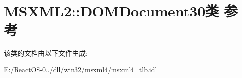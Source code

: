 \hypertarget{class_m_s_x_m_l2_1_1_d_o_m_document30}{}\section{M\+S\+X\+M\+L2\+:\+:D\+O\+M\+Document30类 参考}
\label{class_m_s_x_m_l2_1_1_d_o_m_document30}


该类的文档由以下文件生成\+:\begin{DoxyCompactItemize}
\item 
E\+:/\+React\+O\+S-\/0../dll/win32/msxml4/msxml4\+\_\+tlb.\+idl\end{DoxyCompactItemize}
